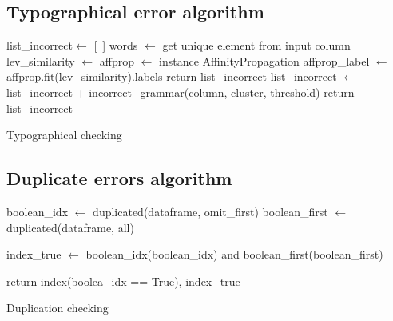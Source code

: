 \documentclass{article}
\begin{document}
\subsection{Typographical error algorithm}
\label{sub:Typographical error algorithm}
\begin{algorithm}[H]
    \BlankLine

    list\_incorrect$\leftarrow$ [~]\;
    words $\leftarrow$ get unique element from input column\;
    {
        lev\_similarity $\leftarrow$ 
        affprop $\leftarrow$ instance AffinityPropagation\;
        affprop\_label $\leftarrow$ affprop.fit(lev\_similarity).labels \;
        {
            return list\_incorrect\;
        }
        {
            {list\_incorrect $\leftarrow$ list\_incorrect + incorrect\_grammar(column, cluster, threshold)\;}
        }
        return list\_incorrect
    }
    \caption{Typographical checking\label{typo}}
\end{algorithm}



\subsection{Duplicate errors algorithm}
\label{code:Duplicate errors algorithm}
\begin{algorithm}[H]
    \BlankLine
    boolean\_idx $\leftarrow$ duplicated(dataframe, omit\_first)\;
    boolean\_first $\leftarrow$ duplicated(dataframe, all)\;

    index\_true $\leftarrow$ boolean\_idx(boolean\_idx) and boolean\_first(boolean\_first)\;

    return index(boolea\_idx == True), index\_true
    \caption{Duplication checking\label{duplicate}}
\end{algorithm}
\end{document}
